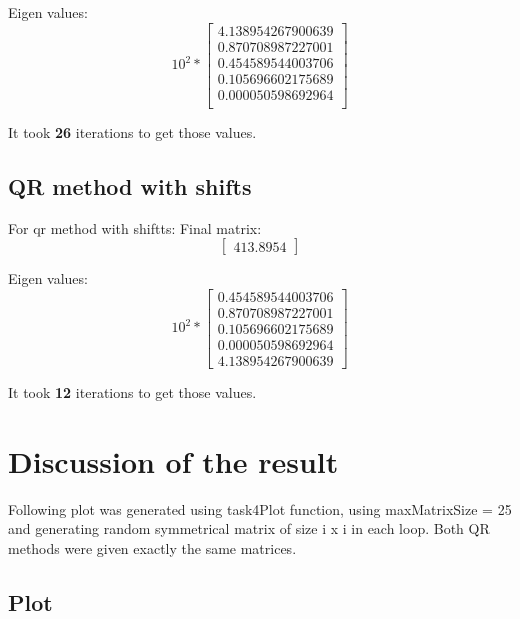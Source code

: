 \documentclass[12pt]{report}
\begin{document}
Eigen values:
\[
10^{2} *
\begin{bmatrix}
  4.138954267900639 \\
   0.870708987227001 \\
   0.454589544003706 \\
   0.105696602175689 \\
   0.000050598692964 \\
\end{bmatrix}
\]

It took \textbf{26} iterations to get those values.

\subsection{QR method with shifts}
For qr method with shiftts:
Final matrix:
\[
\begin{bmatrix}
413.8954
\end{bmatrix}
\]

Eigen values:
\[
10^{2} *
\begin{bmatrix}
  0.454589544003706 \\
  0.870708987227001 \\
  0.105696602175689 \\
  0.000050598692964 \\
  4.138954267900639
\end{bmatrix}
\]

It took \textbf{12} iterations to get those values.

\section{Discussion of the result}
Following plot was generated using task4Plot function, using maxMatrixSize = 25 and generating random symmetrical matrix of size i x i in each loop. Both QR methods were given exactly the same matrices.
\subsection{Plot}
\end{document}
